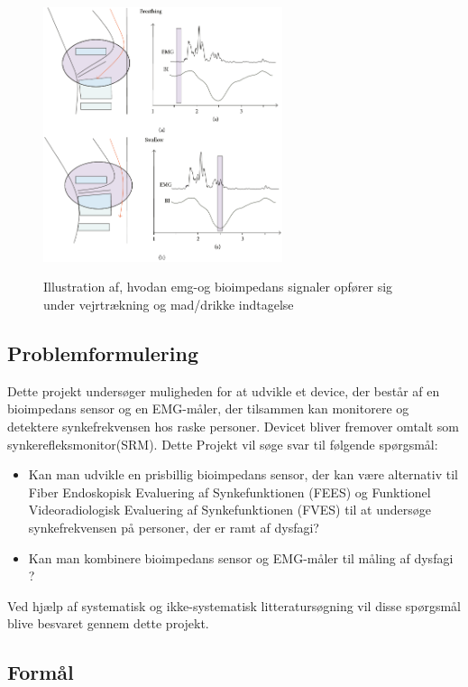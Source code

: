 \begin{figure}[H]
\centering
{\includegraphics[width=7cm]
{Figure/EMGBIGraph}}
\caption{Illustration af, hvodan emg-og bioimpedans signaler opfører sig under vejrtrækning og mad/drikke indtagelse\cite{Schultheiss2014}}
\label{EMGBIGraph} 
\end{figure}

\subsection{Problemformulering}

Dette projekt undersøger muligheden for at udvikle et device, der består af en bioimpedans sensor og en EMG-måler, der tilsammen kan monitorere og detektere synkefrekvensen hos raske personer. Devicet bliver fremover omtalt som synkerefleksmonitor(SRM). Dette Projekt vil søge svar til følgende spørgsmål: 

\begin{itemize}
\item Kan man udvikle en prisbillig bioimpedans sensor, der kan være alternativ til Fiber Endoskopisk Evaluering af Synkefunktionen (FEES) og Funktionel Videoradiologisk Evaluering af Synkefunktionen (FVES) til at undersøge synkefrekvensen på personer, der er ramt af dysfagi?
\item Kan man kombinere bioimpedans sensor og EMG-måler til måling af dysfagi ?


\end{itemize}
Ved hjælp af systematisk og ikke-systematisk litteratursøgning vil disse spørgsmål blive besvaret gennem dette projekt. 

\subsection{Formål}

